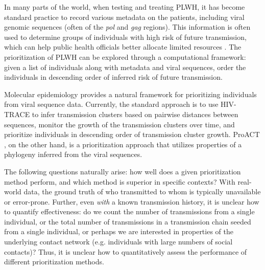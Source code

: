 \documentclass[twocolumn]{bmcart}%
\begin{document}
In many parts of the world, when testing and treating PLWH, it has become standard practice to record various metadata on the patients, including viral genomic sequences (often of the \textit{pol} and \textit{gag} regions). This information is often used to determine groups of individuals with high risk of future transmission, which can help public health officials better allocate limited resources \cite{wertheim2018growth}. 
The prioritization of PLWH can be explored through a computational framework: given a list of individuals along with metadata and viral sequences, order the individuals in descending order of inferred risk of future transmission.

Molecular epidemiology provides a natural framework for prioritizing individuals from viral sequence data. Currently, the standard approach is to use HIV-TRACE \cite{pond2018hivtrace} to infer transmission clusters based on pairwise distances between sequences, monitor the growth of the transmission clusters over time, and prioritize individuals in descending order of transmission cluster growth. ProACT \cite{moshiri2019ProACT}, on the other hand, is a prioritization approach that utilizes properties of a phylogeny inferred from the viral sequences.

The following questions naturally arise: how well does a given prioritization method perform, and which method is superior in specific contexts? With real-world data, the ground truth of who transmitted to whom is typically unavailable or error-prone. Further, even \textit{with} a known transmission history, it is unclear how to quantify effectiveness: do we count the number of transmissions from a single individual,
or the total number of transmissions in a transmission chain seeded from a single individual,
or perhaps we are interested in properties of the underlying contact network (e.g. individuals with large numbers of social contacts)?
Thus, it is unclear how to quantitatively assess the performance of different prioritization methods.
\end{document}

